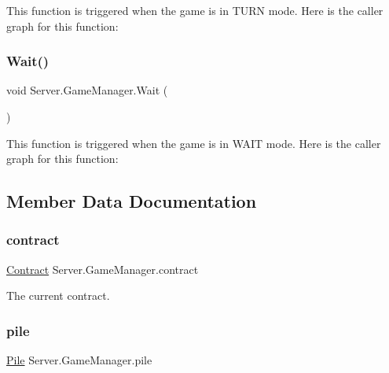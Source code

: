 This function is triggered when the game is in T\+U\+RN mode. Here is the caller graph for this function\+:
\mbox{\label{class_server_1_1_game_manager_a07eb113db9a00aefdb565068ed532915}} 
\subsubsection{\texorpdfstring{Wait()}{Wait()}}
{\footnotesize\ttfamily void Server.\+Game\+Manager.\+Wait (\begin{DoxyParamCaption}{ }\end{DoxyParamCaption})\hspace{0.3cm}{\ttfamily [inline]}}

This function is triggered when the game is in W\+A\+IT mode. Here is the caller graph for this function\+:


\subsection{Member Data Documentation}
\mbox{\label{class_server_1_1_game_manager_af24c716c34949ff495b9a47eec59d88c}} 
\subsubsection{\texorpdfstring{contract}{contract}}
{\footnotesize\ttfamily \hyperlink{class_game_1_1_contract}{Contract} Server.\+Game\+Manager.\+contract}

The current contract. \mbox{\label{class_server_1_1_game_manager_a4aa559ff09ed2f8a2cdcc057ef1173ea}} 
\subsubsection{\texorpdfstring{pile}{pile}}
{\footnotesize\ttfamily \hyperlink{class_game_1_1_pile}{Pile} Server.\+Game\+Manager.\+pile}

